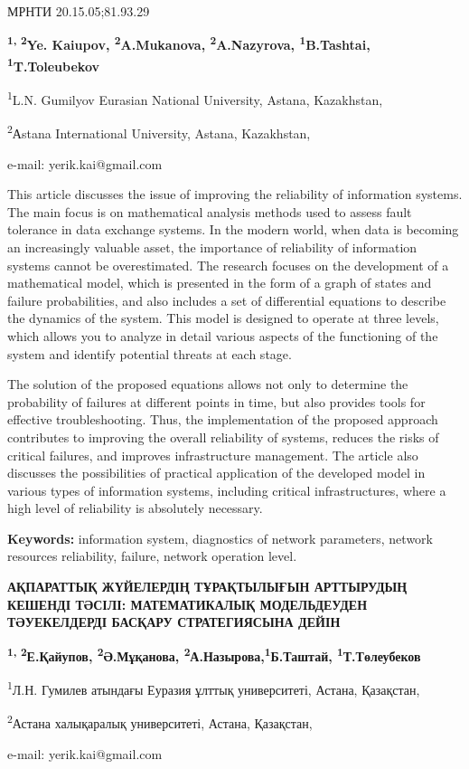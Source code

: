 МРНТИ 20.15.05;81.93.29


\begin{center}
{\bfseries \textsuperscript{1, 2}Ye. Kaiupov,
\textsuperscript{2}A.Mukanova, \textsuperscript{2}A.Nazyrova,
\textsuperscript{1}B.Tashtai, \textsuperscript{1}T.Toleubekov}

\textsuperscript{1}L.N. Gumilyov Eurasian National University, Astana,
Kazakhstan,

\textsuperscript{2}Аstana International University, Astana, Kazakhstan,

e-mail: yerik.kai@gmail.com
\end{center}

This article discusses the issue of improving the reliability of
information systems. The main focus is on mathematical analysis methods
used to assess fault tolerance in data exchange systems. In the modern
world, when data is becoming an increasingly valuable asset, the
importance of reliability of information systems cannot be
overestimated. The research focuses on the development of a mathematical
model, which is presented in the form of a graph of states and failure
probabilities, and also includes a set of differential equations to
describe the dynamics of the system. This model is designed to operate
at three levels, which allows you to analyze in detail various aspects
of the functioning of the system and identify potential threats at each
stage.

The solution of the proposed equations allows not only to determine the
probability of failures at different points in time, but also provides
tools for effective troubleshooting. Thus, the implementation of the
proposed approach contributes to improving the overall reliability of
systems, reduces the risks of critical failures, and improves
infrastructure management. The article also discusses the possibilities
of practical application of the developed model in various types of
information systems, including critical infrastructures, where a high
level of reliability is absolutely necessary.

{\bfseries Keywords:} information system, diagnostics of network
parameters, network resources reliability, failure, network operation
level.

\begin{center}
{\large\bfseries АҚПАРАТТЫҚ ЖҮЙЕЛЕРДІҢ ТҰРАҚТЫЛЫҒЫН АРТТЫРУДЫҢ КЕШЕНДІ ТӘСІЛІ:
МАТЕМАТИКАЛЫҚ МОДЕЛЬДЕУДЕН ТӘУЕКЕЛДЕРДІ БАСҚАРУ СТРАТЕГИЯСЫНА ДЕЙІН}

{\bfseries \textsuperscript{1, 2}Е.Қайупов, \textsuperscript{2}Ә.Мұқанова,
\textsuperscript{2}А.Назырова,\textsuperscript{1}Б.Таштай,
\textsuperscript{1}Т.Төлеубеков}

\textsuperscript{1}Л.Н. Гумилев атындағы Еуразия ұлттық университеті,
Астана, Қазақстан,

\textsuperscript{2}Астана халықаралық университеті, Астана, Қазақстан,

e-mail: yerik.kai@gmail.com
\end{center}

